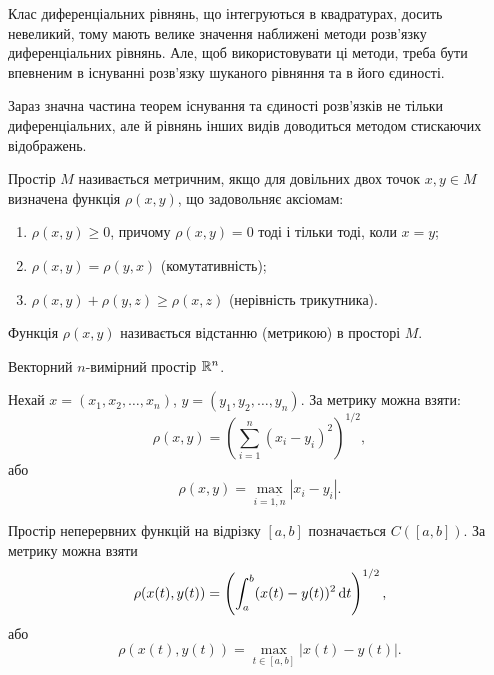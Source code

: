 Клас диференціальних рівнянь, що інтегруються в квадратурах, досить невеликий, тому мають велике значення наближені методи розв'язку диференціальних рівнянь. Але, щоб використовувати ці методи, треба бути впевненим в існуванні розв'язку шуканого рівняння та в його єдиності. \parvskip

Зараз значна частина теорем існування та єдиності розв'язків не тільки диференціальних, але й рівнянь інших видів доводиться методом стискаючих відображень. \parvskip

\begin{definition} 
	Простір $M$ називається метричним, якщо для довільних двох точок $x,y\in M$ визначена функція $\rho(x,y)$, що задовольняє аксіомам:
	\begin{enumerate}
		\item $\rho(x, y)\ge0$, причому $\rho(x,y)=0$ тоді і тільки тоді, коли $x=y$;
		\item $\rho(x,y)=\rho(y,x)$ (комутативність);
		\item $\rho(x,y)+\rho(y,z)\ge\rho(x,z)$ (нерівність трикутника).
	\end{enumerate}

	Функція $\rho(x,y)$ називається відстанню (метрикою) в просторі $M$.
\end{definition}

\begin{example*} 
	Векторний $n$-вимірний простір $\mathbb{R}^n$. \parvskip

	Нехай $x=(x_1,x_2,\ldots,x_n)$, $y=(y_1,y_2,\ldots,y_n)$. За метрику можна взяти: 
	\begin{equation*}
		\rho(x,y)=\left(\sum_{i=1}^n (x_i-y_i)^2\right)^{1/2},
	\end{equation*}
	або 
	\begin{equation*}
		\rho(x,y)=\max_{i=\overline{1,n}}|x_i-y_i|.
	\end{equation*}
\end{example*}

\begin{example*} 
	Простір неперервних функцій на відрізку $[a,b]$ позначається $C([a,b])$. За метрику можна взяти
		\begin{equation*}
		\rho(x(t), y(t)) = \left(\int_a^b (x(t)-y(t))^2 \mathop{}\!\mathrm{d} t\right)^{1/2},
	\end{equation*}
	або
	\begin{equation*}
		\rho(x(t), y(t)) = \max_{t\in[a,b]} |x(t)-y(t)|.
	\end{equation*}
\end{example*}

